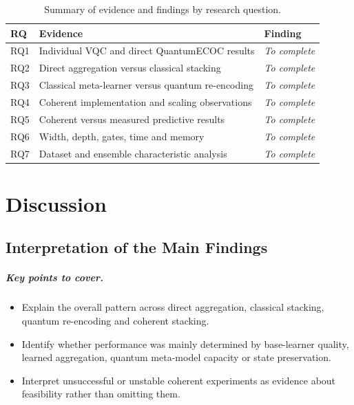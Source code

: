 \documentclass[]{UCD_CS_MSc_AAI_Report}
\newcommand{\sectionbrief}{\paragraph{Key points to cover.}}
\begin{document}
\begin{table}[ht]
    \centering
    \caption{Summary of evidence and findings by research question.}
    \label{tab:rq-summary}
    \begin{tabular}{p{}p{}p{}}
        \toprule
        RQ & Evidence & Finding \\
        \midrule
        RQ1 & Individual VQC and direct QuantumECOC results & \textit{To complete} \\
        RQ2 & Direct aggregation versus classical stacking & \textit{To complete} \\
        RQ3 & Classical meta-learner versus quantum re-encoding & \textit{To complete} \\
        RQ4 & Coherent implementation and scaling observations & \textit{To complete} \\
        RQ5 & Coherent versus measured predictive results & \textit{To complete} \\
        RQ6 & Width, depth, gates, time and memory & \textit{To complete} \\
        RQ7 & Dataset and ensemble characteristic analysis & \textit{To complete} \\
        \bottomrule
    \end{tabular}
\end{table}

\chapter{Discussion}
\label{chap:discussion}

\section{Interpretation of the Main Findings}
\label{sec:discussion-main}

\sectionbrief
\begin{itemize}
    \item Explain the overall pattern across direct aggregation, classical stacking, quantum re-encoding and coherent stacking.
    \item Identify whether performance was mainly determined by base-learner quality, learned aggregation, quantum meta-model capacity or state preservation.
    \item Interpret unsuccessful or unstable coherent experiments as evidence about feasibility rather than omitting them.
\end{itemize}
\end{document}
